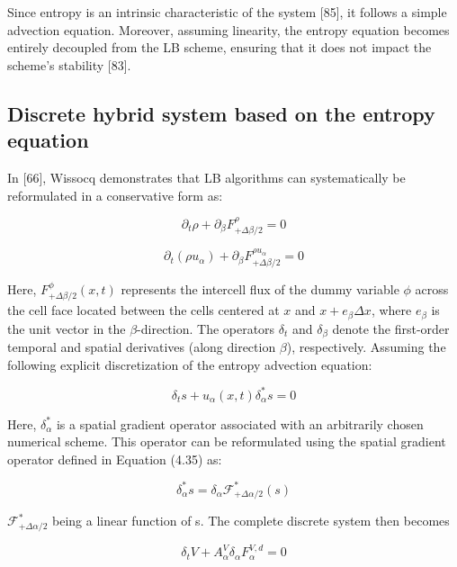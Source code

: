 Since entropy is an intrinsic characteristic of the system [85], it follows a
simple advection equation. Moreover, assuming linearity, the entropy equation
becomes entirely decoupled from the LB scheme, ensuring that it does not impact
the scheme's stability [83].

\subsection{Discrete hybrid system based on the entropy equation}

In [66], Wissocq demonstrates that LB algorithms can systematically be
reformulated in a conservative form as:

\begin{equation}
	\partial_t \rho + \partial_\beta F^{\rho}_{+\Delta\beta/2} = 0
\end{equation}

\begin{equation}
	\partial_t (\rho u_\alpha) + \partial_\beta F^{\rho u_\alpha}_{+\Delta\beta/2} = 0
\end{equation}

Here, $F_{+\Delta \beta/2}^{\phi}(x,t)$ represents the intercell flux of the
dummy variable $\phi$ across the cell face located between the cells centered at
$x$ and $x+e_\beta\Delta x$, where $e_\beta$ is the unit vector in the $\beta$-direction. The
operators $\delta_t$ and $\delta_\beta$ denote the first-order temporal and spatial
derivatives (along direction $\beta$), respectively. Assuming the following explicit
discretization of the entropy advection equation: 

\begin{equation}
	\delta_t s + u_\alpha(x,t)\delta_\alpha^*s = 0
\end{equation}

Here, $\delta_\alpha^*$ is a spatial gradient operator associated with an arbitrarily
chosen numerical scheme. This operator can be reformulated using the spatial
gradient operator defined in Equation (4.35) as:

\begin{equation}
	\delta_\alpha^*s = \delta_\alpha\mathcal{F}^*_{+\Delta\alpha/2}(s)
\end{equation}

$\mathcal{F}^*_{+\Delta\alpha/2}$ being a linear function of s. The complete
discrete system then becomes

\begin{equation}
	\delta_t V + A_\alpha^V\delta_\alpha F_\alpha^{V,d} = 0
\end{equation}

